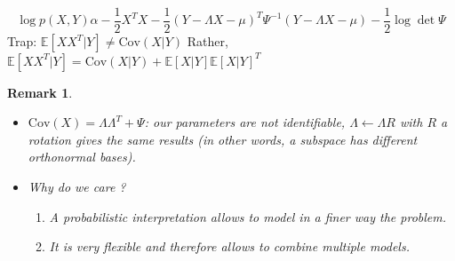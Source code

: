 \documentclass[12pt,a4paper]{report}
\newtheorem{Rq}[lemma]{Remark}
\begin{document}
$$\log p(X,Y) \alpha -\frac{1}{2}X^{T}X - \frac{1}{2}(Y - \Lambda X - \mu)^{T}\Psi^{-1}(Y - \Lambda X - \mu) - \frac{1}{2}\log \det \Psi$$
Trap: $\mathbb{E}[XX^{T}|Y] \neq \mathrm{Cov}(X|Y)$
\newline
Rather, $\mathbb{E}[XX^{T}|Y]=  \mathrm{Cov}(X|Y) + \mathbb{E}[X|Y]\mathbb{E}[X|Y]^{T}$
\begin{Rq}
~\newline
\begin{itemize}
\item $\mathrm{Cov}(X) = \Lambda\Lambda^{T} + \Psi$: our parameters are not identifiable, $\Lambda \leftarrow \Lambda R$ with $R$ a rotation gives the same results (in other words, a subspace has different orthonormal bases).
\item Why do we care ?
\begin{enumerate}
\item A probabilistic interpretation allows to model in a finer way the problem.
\item It is very flexible and therefore allows to combine multiple models.
\end{enumerate}
\end{itemize}
\end{Rq}


\end{document}
